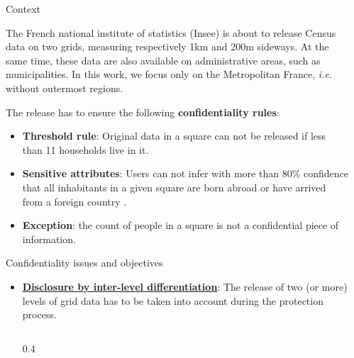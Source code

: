 \documentclass[final,xcolor={dvipsnames,svgnames,table}]{beamer}
\newlength{\sepwidth}
\newlength{\colwidth}
\newcommand{\separatorcolumn}{\begin{column}{\sepwidth}\end{column}}
\begin{document}
\begin{frame}[fragile,t]
\begin{columns}[t]
\separatorcolumn

\begin{column}{\colwidth}
  \vspace{-1cm}
  \begin{block}{Context}

   The French national institute of statistics (Insee) is about to release Census data on two grids, measuring respectively 1km and 200m sideways. At the same time, these data are also available on administrative areas, such as municipalities. In this work, we focus only on the Metropolitan France, \textit{i.e.} without outermost regions.

   The release has to ensure the following \textbf{confidentiality rules}:

   \begin{itemize}
      \item \textbf{Threshold rule}: Original data in a square can not be released if less than 11 households live in it.
      \item \textbf{Sensitive attributes}: Users can not infer with more than 80\% confidence that \og all inhabitants in a given square are born abroad or have arrived from a foreign country \fg.
      \item \textbf{Exception}: the count of people in a square is not a confidential piece of information.
    \end{itemize}


  \end{block}

  \begin{backblock}{Confidentiality issues and objectives}

   \begin{itemize}
      \item \underline{\textbf{Disclosure by inter-level differentiation}}: The release of two (or more) levels of grid data has to be taken into account during the protection process.

      \begin{columns}[t]
      
        \begin{column}{0.4\colwidth}
                     
            \vspace{-1.5cm}
            

\end{column}
\end{columns}
\end{itemize}
\end{backblock}
\end{column}
\end{columns}
\end{frame}
\end{document}
